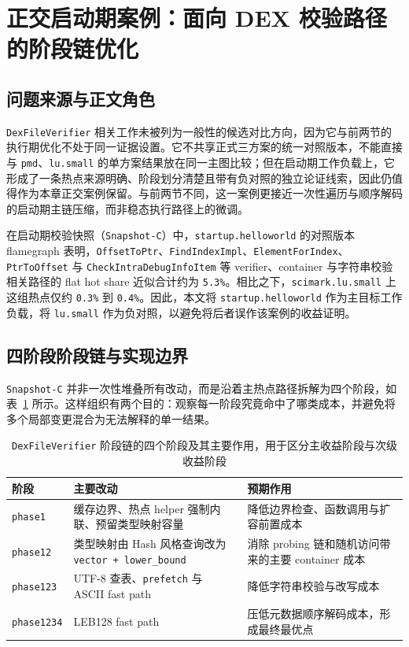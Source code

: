 \section{正交启动期案例：面向 DEX 校验路径的阶段链优化}

\subsection{问题来源与正文角色}

\texttt{DexFileVerifier} 相关工作未被列为一般性的候选对比方向，因为它与前两节的执行期优化不处于同一证据设置。它不共享正式三方案的统一对照版本，不能直接与 \texttt{pmd}、\texttt{lu.small} 的单方案结果放在同一主图比较；但在启动期工作负载上，它形成了一条热点来源明确、阶段划分清楚且带有负对照的独立论证线索，因此仍值得作为本章正交案例保留。与前两节不同，这一案例更接近一次性遍历与顺序解码的启动期主链压缩，而非稳态执行路径上的微调。

在启动期校验快照（\texttt{Snapshot-C}）中，\texttt{startup.helloworld} 的对照版本 flamegraph 表明，\texttt{OffsetToPtr}、\texttt{FindIndexImpl}、\texttt{ElementForIndex}、\texttt{PtrToOffset} 与 \texttt{CheckIntraDebugInfoItem} 等 verifier、container 与字符串校验相关路径的 flat hot share 近似合计约为 \texttt{5.3\%}。相比之下，\texttt{scimark.lu.small} 上这组热点仅约 \texttt{0.3\%} 到 \texttt{0.4\%}。因此，本文将 \texttt{startup.helloworld} 作为主目标工作负载，将 \texttt{lu.small} 作为负对照，以避免将后者误作该案例的收益证明。

\subsection{四阶段阶段链与实现边界}

\texttt{Snapshot-C} 并非一次性堆叠所有改动，而是沿着主热点路径拆解为四个阶段，如表~\ref{tab:dexverifier-phases} 所示。这样组织有两个目的：观察每一阶段究竟命中了哪类成本，并避免将多个局部变更混合为无法解释的单一结果。

\begin{table}[htbp]
    \centering
    \small
    \caption{\texttt{DexFileVerifier} 阶段链的四个阶段及其主要作用，用于区分主收益阶段与次级收益阶段}
    \label{tab:dexverifier-phases}
    \begin{tabular}{>{\raggedright\arraybackslash}p{2.2cm}>{\raggedright\arraybackslash}p{3.0cm}>{\raggedright\arraybackslash}p{6.0cm}}
        \hline
        \textbf{阶段} & \textbf{主要改动} & \textbf{预期作用} \\
        \hline
        \texttt{phase1} & 缓存边界、热点 helper 强制内联、预留类型映射容量 & 降低边界检查、函数调用与扩容前置成本 \\
        \texttt{phase12} & 类型映射由 Hash 风格查询改为 \texttt{vector + lower\_bound} & 消除 probing 链和随机访问带来的主要 container 成本 \\
        \texttt{phase123} & UTF-8 查表、\texttt{prefetch} 与 ASCII fast path & 降低字符串校验与改写成本 \\
        \texttt{phase1234} & LEB128 fast path & 压低元数据顺序解码成本，形成最终最优点 \\
        \hline
    \end{tabular}
\end{table}

